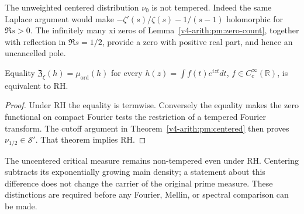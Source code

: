 The unweighted centered distribution $\nu_0$ is not tempered.
Indeed the same Laplace argument would make
$-\zeta'(s)/\zeta(s)-1/(s-1)$ holomorphic for $\Re s>0$.
The infinitely many xi zeros of Lemma~\ref{v4-arith:pm:zero-count},
together with reflection in $\Re s=1/2$, provide a zero with
positive real part, and hence an uncancelled pole.

\begin{corollary}
\label{v4-arith:pm:shadow}
Equality $\mathfrak Z_\xi(h)=\mu_{\mathrm{ord}}(h)$ for every
$h(z)=\int f(t)e^{izt}dt$, $f\in C_c^\infty(\mathbb R)$,
is equivalent to RH.
\end{corollary}
\begin{proof}
Under RH the equality is termwise. Conversely the equality makes
the zero functional on compact Fourier tests the restriction of a
tempered Fourier transform. The cutoff argument in
Theorem~\ref{v4-arith:pm:centered} then proves
$\nu_{1/2}\in\mathscr S'$. That theorem implies RH.
\end{proof}

The uncentered critical measure remains non-tempered even under RH.
Centering subtracts its exponentially growing main density; a
statement about this difference does not change the carrier of the
original prime measure. These distinctions are required before
any Fourier, Mellin, or spectral comparison can be made.
